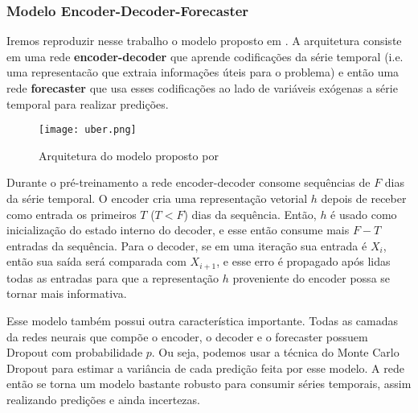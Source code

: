 \subsubsection{Modelo Encoder-Decoder-Forecaster}

Iremos reproduzir nesse trabalho o modelo proposto em \cite{ubertime}. A
arquitetura consiste em uma rede \textbf{encoder-decoder} que aprende codificações da
série temporal (i.e. uma representacão que extraia informações úteis para o
problema) e então uma rede \textbf{forecaster} que usa esses codificações ao lado de
variáveis exógenas a série temporal para realizar predições.  


\begin{figure}[H]
\centering
\texttt{[image: uber.png]}
\caption{Arquitetura do modelo proposto por \cite{ubertime}}
\end{figure}


Durante o pré-treinamento a rede encoder-decoder consome sequências de $F$ dias
da série temporal. O encoder cria uma representação vetorial $h$ depois de
receber como entrada os primeiros $T$ ($T < F$) dias da sequência. Então, $h$ é usado como
inicialização do estado interno do decoder, e esse então consume mais $F - T$
entradas da sequência. Para o decoder, se em uma iteração sua entrada é $X_i$,
então sua saída será comparada com $X_{i+1}$, e esse erro é propagado após lidas
todas as entradas para que a representação $h$ proveniente do encoder possa se
tornar mais informativa.


Esse modelo também possui outra característica importante. Todas as camadas da
redes neurais que compõe o encoder, o decoder e o forecaster possuem
Dropout com probabilidade $p$. Ou seja, podemos usar a técnica do Monte
Carlo Dropout para estimar a variância de cada predição feita por esse modelo. A
rede então se torna um modelo bastante robusto para consumir séries temporais,
assim realizando predições e ainda incertezas.\\










